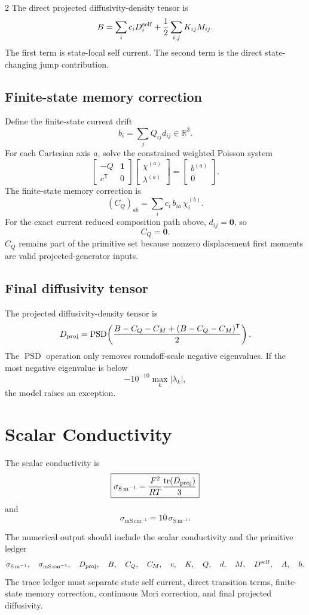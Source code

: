 \documentclass[10pt]{article}
\newcommand{\R}{\mathbb{R}}
\newcommand{\T}{\mathsf{T}}
\newcommand{\tr}{\operatorname{tr}}
\newcommand{\Sm}{\mathrm{S\,m^{-1}}}
\newcommand{\mScm}{\mathrm{mS\,cm^{-1}}}
\newcommand{\one}{\mathbf{1}}
\newcommand{\zero}{\mathbf{0}}
\begin{document}
\begin{multicols}{2}
The direct projected diffusivity-density tensor is
\[
B
=
\sum_i c_iD^{\rm self}_i
+\frac{1}{2}\sum_{i,j}K_{ij}M_{ij}.
\]
The first term is state-local self current. The second term is the direct
state-changing jump contribution.

\subsection{Finite-state memory correction}

Define the finite-state current drift
\[
b_i=\sum_j Q_{ij}d_{ij}\in\R^3.
\]
For each Cartesian axis \(a\), solve the constrained weighted Poisson system
\[
\begin{bmatrix}
-Q & \one\\
c^\T & 0
\end{bmatrix}
\begin{bmatrix}
\chi^{(a)}\\
\lambda^{(a)}
\end{bmatrix}
=
\begin{bmatrix}
b^{(a)}\\
0
\end{bmatrix}.
\]
The finite-state memory correction is
\[
(C_Q)_{ab}
=
\sum_i c_i\,b_{ia}\,\chi_i^{(b)}.
\]
For the exact current reduced composition path above, \(d_{ij}=\zero\), so
\[
C_Q=\zero.
\]
\(C_Q\) remains part of the primitive set because nonzero displacement first
moments are valid projected-generator inputs.

\subsection{Final diffusivity tensor}

The projected diffusivity-density tensor is
\[
D_{\rm proj}
=
\operatorname{PSD}\!\left(\frac{B-C_Q-C_M+(B-C_Q-C_M)^\T}{2}\right).
\]
The \(\operatorname{PSD}\) operation only removes roundoff-scale negative
eigenvalues. If the most negative eigenvalue is below
\[
-10^{-10}\max_k|\lambda_k|,
\]
the model raises an exception.

\section{Scalar Conductivity}

The scalar conductivity is
\[
\boxed{
\sigma_{\Sm}
=
\frac{F^2}{RT}\frac{\tr(D_{\rm proj})}{3}
}
\]
and
\[
\boxed{
\sigma_{\mScm}=10\,\sigma_{\Sm}.
}
\]

The numerical output should include the scalar conductivity and the primitive
ledger
\[
\sigma_{\Sm},\quad
\sigma_{\mScm},\quad
D_{\rm proj},\quad
B,\quad
C_Q,\quad
C_M,\quad
c,\quad
K,\quad
Q,\quad
d,\quad
M,\quad
D^{\rm self},\quad
A,\quad
h.
\]
The trace ledger must separate state self current, direct transition terms,
finite-state memory correction, continuous Mori correction, and final projected
diffusivity.


\end{multicols}
\end{document}

